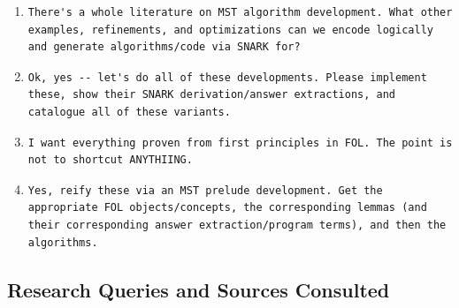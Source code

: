 \documentclass[runningheads]{llncs}
\begin{document}
\begin{enumerate}
\begin{lstlisting}
Please encode the algorithm abstractly and hierarchically frame the various algorithms as logical refinements, with the SNARK conditions/specifications and the subsequent answer extraction providing the refinements and their direct implementations.
\end{lstlisting}
\item
\begin{lstlisting}
There's a whole literature on MST algorithm development. What other examples, refinements, and optimizations can we encode logically and generate algorithms/code via SNARK for?
\end{lstlisting}
\item
\begin{lstlisting}
Ok, yes -- let's do all of these developments. Please implement these, show their SNARK derivation/answer extractions, and catalogue all of these variants.
\end{lstlisting}
\item
\begin{lstlisting}
I want everything proven from first principles in FOL. The point is not to shortcut ANYTHIING.
\end{lstlisting}
\item
\begin{lstlisting}
Yes, reify these via an MST prelude development. Get the appropriate FOL objects/concepts, the corresponding lemmas (and their corresponding answer extraction/program terms), and then the algorithms.
\end{lstlisting}
\end{enumerate}

\subsection{Research Queries and Sources Consulted}
\end{document}
